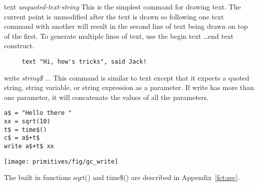 \begin{commanddescription}
\item[{\sf text {\it unquoted-text-string}}]
  This is the simplest command for drawing text.  The current point
is unmodified after the text is drawn so following one text command
with another will result in the second line of text being drawn on
top of the first.
To generate multiple lines of text, use the {\sf begin text} \ldots {\sf  end
text} construct.

\preglecode{}
\begin{Verbatim}
     text "Hi, how's tricks", said Jack!
\end{Verbatim}
\postglecode{}

\item[{\sf write {\it string\$} $\ldots$}]
 This command is similar to {\sf text} except that it expects a quoted string,
string variable, or string expression as a parameter. If write has more than one parameter, it will concatenate the values of all the parameters.

\begin{minipage}[c]{8cm}
\begin{Verbatim}
a$ = "Hello there "
xx = sqrt(10)
t$ = time$()
c$ = a$+t$ 
write a$+t$ xx
\end{Verbatim}
\end{minipage}
\hfill
\begin{minipage}[c]{7cm}
\mbox{\texttt{[image: primitives/fig/gc\_write]}}
\end{minipage}

The built in functions {\sf sqrt()} and {\sf time\$()} are described in
Appendix~\ref{fct:sec}.

\end{commanddescription}

